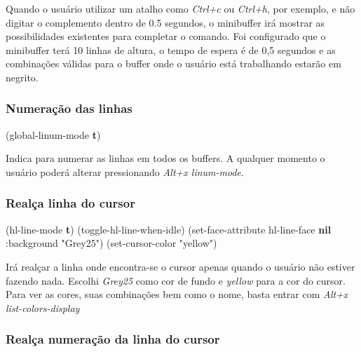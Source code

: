 \documentclass[]{article}
\newenvironment{Shaded}{}{}
\newcommand{\KeywordTok}[1]{\textcolor[rgb]{0.00,0.44,0.13}{\textbf{{#1}}}}
\newcommand{\StringTok}[1]{\textcolor[rgb]{0.25,0.44,0.63}{{#1}}}
\newcommand{\NormalTok}[1]{{#1}}
\begin{document}
Quando o usuário utilizar um atalho como \emph{Ctrl+c} ou \emph{Ctrl+h},
por exemplo, e não digitar o complemento dentro de 0.5 segundos, o
minibuffer irá mostrar as possibilidades existentes para completar o
comando. Foi configurado que o minibuffer terá 10 linhas de altura, o
tempo de espera é de 0,5 segundos e as combinações válidas para o buffer
onde o usuário está trabalhando estarão em negrito.

\subsubsection{Numeração das linhas}\label{numerauxe7uxe3o-das-linhas}

\begin{Shaded}
\begin{Highlighting}[]
\NormalTok{(global-linum-mode }\KeywordTok{t}\NormalTok{)}
\end{Highlighting}
\end{Shaded}

Indica para numerar as linhas em todos os buffers. A qualquer momento o
usuário poderá alterar pressionando \emph{Alt+x linum-mode}.

\subsubsection{Realça linha do cursor}\label{realuxe7a-linha-do-cursor}

\begin{Shaded}
\begin{Highlighting}[]
\NormalTok{(hl-line-mode }\KeywordTok{t}\NormalTok{)}
\NormalTok{(toggle-hl-line-when-idle)}
\NormalTok{(set-face-attribute hl-line-face }\KeywordTok{nil} \NormalTok{:background }\StringTok{"Grey25"}\NormalTok{)}
\NormalTok{(set-cursor-color }\StringTok{"yellow"}\NormalTok{)}
\end{Highlighting}
\end{Shaded}

Irá realçar a linha onde encontra-se o cursor apenas quando o usuário
não estiver fazendo nada. Escolhi \emph{Grey25} como cor de fundo e
\emph{yellow} para a cor do cursor. Para ver as cores, suas combinações
bem como o nome, basta entrar com \emph{Alt+x list-colors-display}

\subsubsection{Realça numeração da linha do
cursor}\label{realuxe7a-numerauxe7uxe3o-da-linha-do-cursor}
\end{document}
